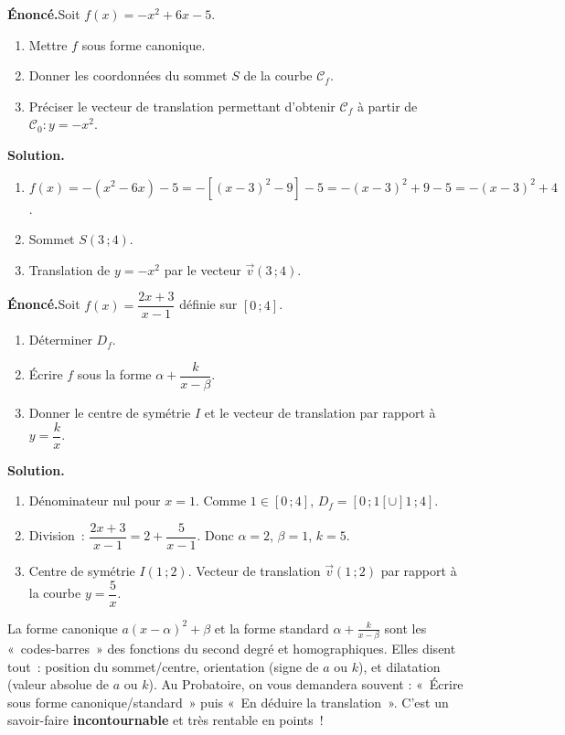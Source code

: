 \documentclass[11pt]{article}
\begin{document}
\begin{exoresolu}
\textbf{Énoncé.}\quad Soit $f(x) = -x^2 + 6x - 5$.
\begin{enumerate}
    \item Mettre $f$ sous forme canonique.
    \item Donner les coordonnées du sommet $S$ de la courbe $\mathcal{C}_f$.
    \item Préciser le vecteur de translation permettant d'obtenir $\mathcal{C}_f$ à partir de $\mathcal{C}_0 : y = -x^2$.
\end{enumerate}
\tcblower
\textbf{Solution.}
\begin{enumerate}
    \item $f(x) = -(x^2 - 6x) - 5 = -\left[(x-3)^2 - 9\right] - 5 = -(x-3)^2 + 9 - 5 = -(x-3)^2 + 4$.
    \item Sommet $S(3\,; 4)$.
    \item Translation de $y = -x^2$ par le vecteur $\vec{v}(3\,; 4)$.
\end{enumerate}
\end{exoresolu}

\begin{exoresolu}
\textbf{Énoncé.}\quad Soit $f(x) = \dfrac{2x+3}{x-1}$ définie sur $[0\,; 4]$.
\begin{enumerate}
    \item Déterminer $D_f$.
    \item Écrire $f$ sous la forme $\alpha + \dfrac{k}{x-\beta}$.
    \item Donner le centre de symétrie $I$ et le vecteur de translation par rapport à $y = \dfrac{k}{x}$.
\end{enumerate}
\tcblower
\textbf{Solution.}
\begin{enumerate}
    \item Dénominateur nul pour $x=1$. Comme $1 \in [0\,;4]$, $D_f = [0\,;1[ \cup ]1\,;4]$.
    \item Division~: $\dfrac{2x+3}{x-1} = 2 + \dfrac{5}{x-1}$.
    Donc $\alpha = 2$, $\beta = 1$, $k = 5$.
    \item Centre de symétrie $I(1\,; 2)$.
    Vecteur de translation $\vec{v}(1\,; 2)$ par rapport à la courbe $y = \dfrac{5}{x}$.
\end{enumerate}
\end{exoresolu}

\begin{savaistu}
La forme canonique $a(x-\alpha)^2+\beta$ et la forme standard $\alpha+\frac{k}{x-\beta}$ sont les «~codes-barres~» des fonctions du second degré et homographiques. Elles disent tout~: position du sommet/centre, orientation (signe de $a$ ou $k$), et dilatation (valeur absolue de $a$ ou $k$). Au Probatoire, on vous demandera souvent : «~Écrire sous forme canonique/standard~» puis «~En déduire la translation~». C'est un savoir-faire \textbf{incontournable} et très rentable en points~!
\end{savaistu}
\end{document}

